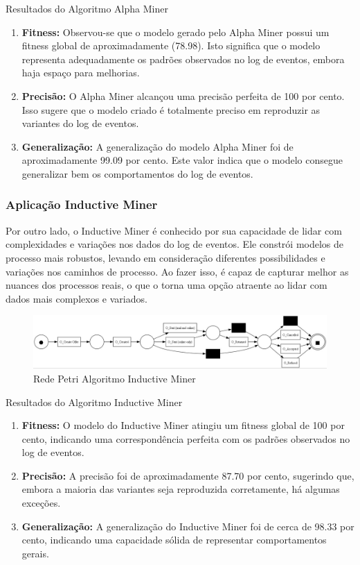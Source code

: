 \documentclass[tcc2]{classe_uftex/uftex}
\begin{document}
Resultados do Algoritmo Alpha Miner

\begin{enumerate}
    \item \textbf{Fitness:} Observou-se que o modelo gerado pelo Alpha Miner possui um fitness global de aproximadamente (78.98). Isto significa que o modelo representa adequadamente os padrões observados no log de eventos, embora haja espaço para melhorias.
    
        \item \textbf {Precisão:} O Alpha Miner alcançou uma precisão perfeita de 100 por cento. Isso sugere que o modelo criado é totalmente preciso em reproduzir as variantes do log de eventos.
    
    \item \textbf{Generalização:} A generalização do modelo Alpha Miner foi de aproximadamente 99.09 por cento. Este valor indica que o modelo consegue generalizar bem os comportamentos do log de eventos.
    
\end{enumerate}

\subsubsection{Aplicação Inductive Miner }
Por outro lado, o Inductive Miner é conhecido por sua capacidade de lidar com complexidades e variações nos dados do log de eventos. Ele constrói modelos de processo mais robustos, levando em consideração diferentes possibilidades e variações nos caminhos de processo. Ao fazer isso, é capaz de capturar melhor as nuances dos processos reais, o que o torna uma opção atraente ao lidar com dados mais complexos e variados.

\begin{figure}[h]
    \centering
    \includegraphics[width=12cm]{tcc_example/Indutivo_miner.jpg}
    \caption{Rede Petri Algoritmo Inductive Miner}
\end{figure}

Resultados do Algoritmo Inductive Miner

\begin{enumerate}
    \item \textbf{Fitness:} O modelo do Inductive Miner atingiu um fitness global de 100 por cento, indicando uma correspondência perfeita com os padrões observados no log de eventos.
    
        \item \textbf {Precisão:} A precisão foi de aproximadamente 87.70 por cento, sugerindo que, embora a maioria das variantes seja reproduzida corretamente, há algumas exceções.
    
    \item \textbf{Generalização:} A generalização do Inductive Miner foi de cerca de 98.33 por cento, indicando uma capacidade sólida de representar comportamentos gerais.
    
\end{enumerate}
\end{document}
